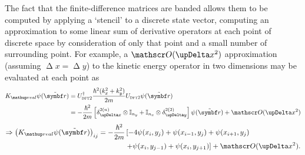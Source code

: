 The fact that the finite-difference matrices are banded allows them to be computed by applying a `stencil' to a discrete state vector, computing an approximation to some linear sum of derivative operators at each point of discrete space by consideration of only that point and a small number of surrounding point. For example, a $\Ord{\upDelta x^2}$ approximation (assuming $\upDelta x = \upDelta y$) to the kinetic energy operator in two dimensions may be evaluated at each point as
\begin{align}
K_\up{real}\psi(\tilde{\vec r}) & = U^\dagger_{\textsc{dft2}} \frac{\hbar^2 (k_x^2 + k_y^2)}{2m} U_{\textsc{dft2}}\psi(\tilde{\vec r})\label{eq:2DKreal}\\
&= -\frac{\hbar^2}{2m} \left[
  \delta^{2 (n)}_{\upDelta x} \otimes \mathbb{I}_{n_y}
+ \mathbb{I}_{n_x} \otimes \delta^{2 (2)}_{\upDelta y}\right]\psi(\tilde{\vec r}) + \Ord{\upDelta x^2}\label{eq:finite_differences_subspaces}
\end{align} 
\begin{align}
\Rightarrow \left(K_\up{real}\psi(\tilde{\vec r})\right)_{ij}
= -\frac{\hbar^2}{2m} &\left[ - 4\psi(x_i,  y_j)
                             + \psi(x_{i-1},  y_j) + \psi(x_{i+1},  y_j) \right.\nonumber\\
                            &\left.  + \psi(x_i,  y_{j-1}) + \psi(x_i,  y_{j+1})\right] + \Ord{\upDelta x^2}.
\end{align} 

